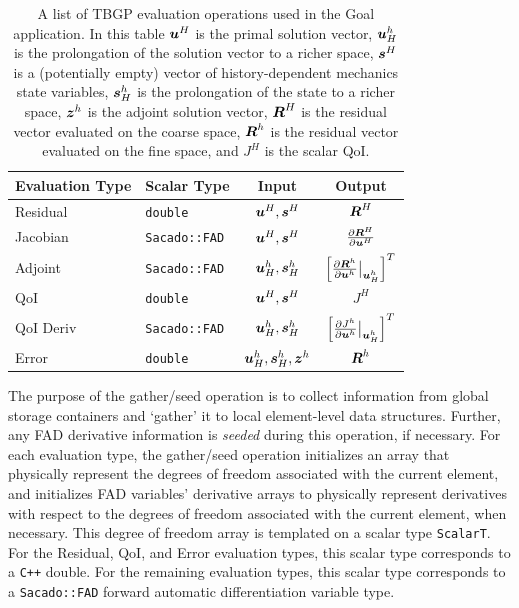 \begin{table}[ht!]
\tabulinesep=1.2mm
\centering
\begin{tabu}{| l |  l | c | c |} \hline
Evaluation Type & Scalar Type & Input & Output \\ \hline \hline
Residual & \texttt{double} & $\boldsymbol{u}^H, \boldsymbol{s}^H$ & $\boldsymbol{R}^H$ \\ \hline
Jacobian & \texttt{Sacado::FAD} & $\boldsymbol{u}^H, \boldsymbol{s}^H$ & $\frac{\partial \boldsymbol{R}^H}{\partial \boldsymbol{u}^H}$ \\ \hline
Adjoint & \texttt{Sacado::FAD} & $\boldsymbol{u}^h_H, \boldsymbol{s}^h_H$ & $\left[ \frac{\partial \boldsymbol{R}^h}{\partial \boldsymbol{u}^h} \bigr|_{\boldsymbol{u}^h_H} \right]^T$ \\ \hline
QoI & \texttt{double} & $\boldsymbol{u}^H, \boldsymbol{s}^H$ & $J^H$ \\ \hline
QoI Deriv & \texttt{Sacado::FAD} & $\boldsymbol{u}^h_H, \boldsymbol{s}^h_H$ & $ \left[ \frac{ \partial J^h} { \partial \boldsymbol{u}^h} \bigr|_{\boldsymbol{u}^h_H} \right]^T $ \\ \hline
Error & \texttt{double} & $\boldsymbol{u}^h_H, \boldsymbol{s}^h_H, \boldsymbol{z}^h$ & $\boldsymbol{R}^h$ \\ \hline
\end{tabu}
\caption{A list of TBGP evaluation operations used in the Goal application.
In this table $\boldsymbol{u}^H$ is the primal solution vector, $\boldsymbol{u}^h_H$ is the
prolongation of the solution vector to a richer space, $\boldsymbol{s}^H$ is a
(potentially empty) vector of history-dependent mechanics state variables,
$\boldsymbol{s}^h_H$ is the prolongation of the state to a richer space,
$\boldsymbol{z}^h$ is the adjoint solution vector,
$\boldsymbol{R}^H$ is the residual vector evaluated on the coarse space,
$\boldsymbol{R}^h$ is the residual vector evaluated on the fine space, and
$J^H$ is the scalar QoI.}
\label{tab:software_evaluations}
\end{table}

The purpose of the gather/seed operation is to collect information
from global storage containers and `gather' it to local element-level
data structures. Further, any FAD derivative information is \emph{seeded}
during this operation, if necessary. For each evaluation type, the
gather/seed operation initializes an array that physically represent the
degrees of freedom associated with the current element, and
initializes FAD variables' derivative arrays to physically represent
derivatives with respect to the degrees of freedom associated with
the current element, when necessary. This degree of freedom array is
templated on a scalar type \texttt{ScalarT}. For the Residual, QoI,
and Error evaluation types, this scalar type corresponds to a
\texttt{C++} double. For the remaining evaluation types, this
scalar type corresponds to a \texttt{Sacado::FAD} forward automatic
differentiation variable type.

